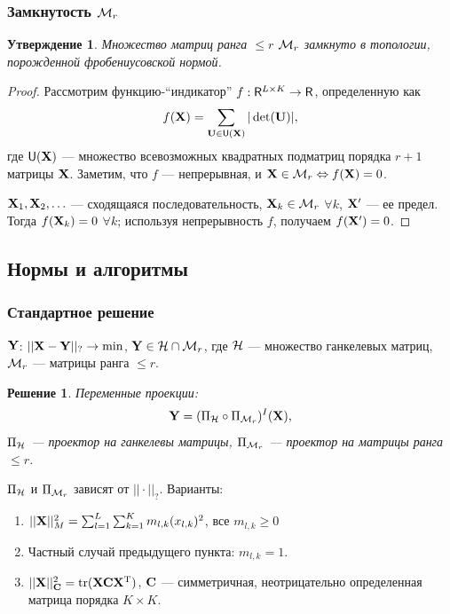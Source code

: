 \documentclass[unicode, notheorems]{beamer}
\newtheorem{proposition}{Утверждение}
\newtheorem{solution}{Решение}
\begin{document}
\begin{frame}
	\frametitle{Замкнутость $\mathcal{M}_r$}
	\begin{proposition} \small
		Множество матриц ранга $\le r$ $\mathcal{M}_r$ замкнуто в топологии, порожденной фробениусовской нормой.
	\end{proposition}
	
	\begin{proof} \small
		Рассмотрим функцию-``индикатор'' $f: \mathsf{R}^{L \times K} \to \mathsf{R}$, определенную как \begin{equation*}
		f(\mathbf{X}) = \sum_{\mathbf{U} \in \mathsf{U}(\mathbf{X})} |\det(\mathbf{U})|,
		\end{equation*}
		где $\mathsf{U}(\mathbf{X})$ --- множество всевозможных квадратных подматриц порядка $r+1$ матрицы $\mathbf{X}$. Заметим, что $f$ --- непрерывная, и $\mathbf{X} \in \mathcal{M}_r \Leftrightarrow f(\mathbf{X}) = 0$.
		
		$\mathbf{X}_1, \mathbf{X}_2, \ldots$ --- сходящаяся последовательность, $\mathbf{X}_k \in \mathcal{M}_r$ $\forall k$, $\mathbf{X}'$ --- ее предел. Тогда $f(\mathbf{X}_k) = 0$ $\forall k$; используя непрерывность $f$, получаем $f(\mathbf{X}') = 0$.
	\end{proof}	
\end{frame}

\subsection{Нормы и алгоритмы}
\begin{frame}
	\frametitle{Стандартное решение}
	$\mathbf{Y}$: $||\mathbf{X} - \mathbf{Y}||_? \to \min$, $\mathbf{Y} \in \mathcal{H} \cap \mathcal{M}_r$, где $\mathcal{H}$ --- множество ганкелевых матриц, $\mathcal{M}_r$ --- матрицы ранга $\le r$.
	
	\begin{solution}
		
		Переменные проекции: 
		\begin{equation*}
		\mathbf{Y} = (\Pi_{\mathcal{H}} \circ \Pi_{\mathcal{M}_r})^I (\mathbf{X}),
		\end{equation*}
		$\Pi_{\mathcal{H}}$ --- проектор на ганкелевы матрицы, $\Pi_{\mathcal{M}_r}$ --- проектор на матрицы ранга $\le r$.
	\end{solution}
	
	$\Pi_{\mathcal{H}}$ и $\Pi_{\mathcal{M}_r}$ зависят от $||\cdot||_?$. Варианты:
	\begin{enumerate}
		\item $||\mathbf{X}||_M^2 = \sum_{l = 1}^L \sum_{k = 1}^K m_{l, k} (x_{l, k})^2$, все $m_{l, k} \ge 0$
		\item Частный случай предыдущего пункта: $m_{l, k} = 1$.
		\item $||\mathbf{X}||_{\mathbf{C}}^2 = \text{tr}(\mathbf{X} \mathbf{C} \mathbf{X}^{\mathrm{T}})$, $\mathbf{C}$ --- симметричная, неотрицательно определенная матрица порядка $K \times K$.
	\end{enumerate}
\end{frame}
\end{document}
